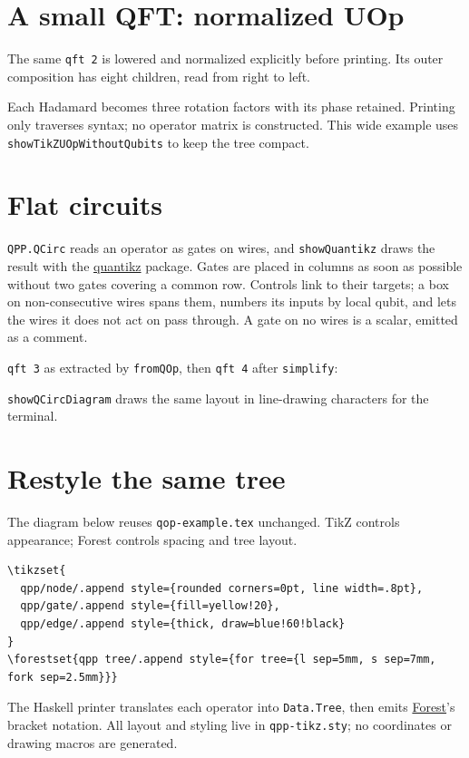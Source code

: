 \documentclass[11pt,a4paper,landscape]{article}
\begin{document}
\newpage
\section*{A small QFT: normalized UOp}
The same \texttt{qft 2} is lowered and normalized explicitly before printing.
Its outer composition has eight children, read from right to left.
\begin{center}\end{center}
Each Hadamard becomes three rotation factors with its phase retained.
Printing only traverses syntax; no operator matrix is constructed.
This wide example uses \texttt{showTikZUOpWithoutQubits} to keep the tree compact.

\newpage
\section*{Flat circuits}
\texttt{QPP.QCirc} reads an operator as gates on wires, and \texttt{showQuantikz}
draws the result with the \href{https://ctan.org/pkg/quantikz}{quantikz} package.
Gates are placed in columns as soon as possible without two gates covering a common
row. Controls link to their targets; a box on non-consecutive wires spans them, numbers
its inputs by local qubit, and lets the wires it does not act on pass through.
A gate on no wires is a scalar, emitted as a comment.
\begin{center}
\qquad
\end{center}
\texttt{qft 3} as extracted by \texttt{fromQOp}, then \texttt{qft 4} after \texttt{simplify}:
\begin{center}

\par\bigskip

\end{center}
\texttt{showQCircDiagram} draws the same layout in line-drawing characters for the terminal.

\newpage
\section*{Restyle the same tree}
The diagram below reuses \texttt{qop-example.tex} unchanged.
TikZ controls appearance; Forest controls spacing and tree layout.
\begin{verbatim}
\tikzset{
  qpp/node/.append style={rounded corners=0pt, line width=.8pt},
  qpp/gate/.append style={fill=yellow!20},
  qpp/edge/.append style={thick, draw=blue!60!black}
}
\forestset{qpp tree/.append style={for tree={l sep=5mm, s sep=7mm, fork sep=2.5mm}}}
\end{verbatim}
\begingroup
{}
\begin{center}\end{center}
\endgroup
\small The Haskell printer translates each operator into \texttt{Data.Tree},
then emits \href{https://ctan.org/pkg/forest}{Forest}'s bracket notation.
All layout and styling live in \texttt{qpp-tikz.sty}; no coordinates or drawing macros
are generated.
\end{document}
